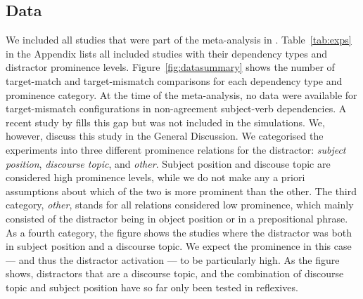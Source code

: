 \documentclass{cambridge7A}\usepackage[]{graphicx}\usepackage[]{color}
\newcommand{\revised}[1]{#1}
\newcommand{\revisedII}[1]{#1}
\begin{document}
\subsection{Data}
We included all studies that were part of the meta-analysis in \cite{JaegerEngelmannVasishth2017}. 
\revisedII{Table~\ref{tab:exps} in the Appendix lists all included studies with their dependency types and distractor prominence levels.
Figure~\ref{fig:datasummary} shows the number of target-match and target-mismatch comparisons for each dependency type and prominence category.
At the time of the meta-analysis, no data were available for target-mismatch configurations in non-agreement subject-verb dependencies.}
A recent study by \cite{CunningsSturt2018} fills this gap but was not included in the simulations. We, however, discuss this study in the General Discussion.
We categorised the experiments into three different prominence relations for the distractor: \textit{subject position}, \revised{\textit{discourse topic}}, and \textit{other}. Subject position and \revised{discouse topic} are considered high prominence levels, while we do not make any a priori assumptions about which of \revised{the two} is more prominent than the other. The third category, \textit{other}, stands for all relations considered low prominence, which mainly consisted of the distractor being in object position or in a prepositional phrase. 
As a fourth category, the figure shows the studies where the distractor was both in subject position and \revised{a discourse topic}. We expect the prominence in this case --- and thus the distractor activation --- \revised{to be} particularly high.
As the figure shows, distractors \revised{that are a discourse topic}, and the combination of \revised{discourse topic} and subject position have so far only been tested in reflexives.

\end{document}

